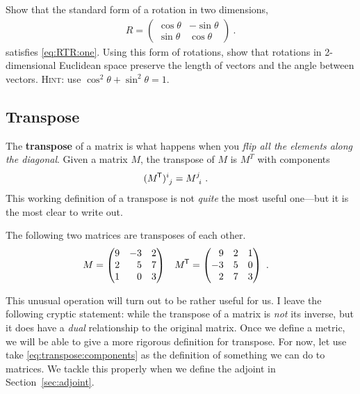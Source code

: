 \documentclass[12pt, oneside]{report}    %
\let\oldsection\section
\def\section{%
  \setcounter{sidenote}{1}%
  \oldsection
}
\begin{document}
\begin{exercise}
Show that the standard form of a rotation in two dimensions,
\begin{align}
R=
    \begin{pmatrix}
    \cos \theta & -\sin\theta \\
    \sin \theta & \cos\theta      
    \end{pmatrix} \ .
\end{align}
satisfies \eqref{eq:RTR:one}. Using this form of rotations, show that rotations in 2-dimensional Euclidean space preserve the length of vectors and the angle between vectors. \textsc{Hint}: use $\cos^2\theta + \sin^2\theta = 1$.
\end{exercise}

\begin{subappendices}
\section{Transpose}\label{sec:transpose}
The \textbf{transpose} of a matrix is what happens when you \emph{flip all the elements along the diagonal}. Given a matrix $M$, the transpose of $M$ is $M^T$ with components
\begin{align}
    (M^\trans)\aij{i}{j} &= M\aij{j}{i} \ .
    \label{eq:transpose:components}
\end{align}
This working definition of a transpose is not \emph{quite} the most useful one---but it is the most clear to write out.

\begin{example}
The following two matrices are transposes of each other.
\begin{align}
    M &= 
    \begin{pmatrix}
        9 & -3 & 2 \\
        2 & \pp 5 & 7 \\
        1 & \pp 0 & 3
    \end{pmatrix}
    &
    M^\trans &= 
    \begin{pmatrix}
        \pp 9 & 2 & 1 \\
        -3 & 5 & 0 \\
        \pp 2 & 7 & 3
    \end{pmatrix}
    \ .
\end{align}
\end{example}

This unusual operation will turn out to be rather useful for us. I leave the following cryptic statement: while the transpose of a matrix is \emph{not} its inverse, but it does have a \emph{dual} relationship to the original matrix. Once we define a metric, we will be able to give a more rigorous definition for transpose. For now, let use take \eqref{eq:transpose:components} as the definition of something we can do to matrices. We tackle this properly when we define the adjoint in Section~\ref{sec:adjoint}.



\end{subappendices}
\end{document}
